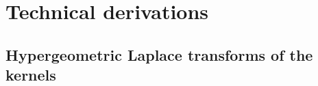 
\section{Technical derivations}
\label{app:technical}

\subsection{Hypergeometric Laplace transforms of the kernels}
\label{app:transforms}

